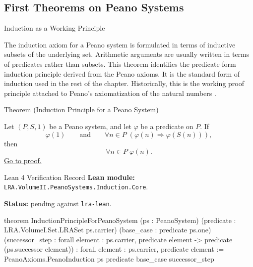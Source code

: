 \subsection*{First Theorems on Peano Systems}

\begin{topicbox}{Induction as a Working Principle}
\begin{exposition}
The induction axiom for a Peano system is formulated in terms of inductive
subsets of the underlying set. Arithmetic arguments are usually written in
terms of predicates rather than subsets. This theorem identifies the
predicate-form induction principle derived from the Peano axioms. It is the
standard form of induction used in the rest of the chapter. Historically,
this is the working proof principle attached to Peano's axiomatization of the
natural numbers \citep{PeanoArithmeticesPrincipia1889}.
\end{exposition}

\begin{theorembox}{Theorem (Induction Principle for a Peano System)}
\begin{theorem}
\label{thm:induction-principle-for-peano-system}
Let $(P,S,1)$ be a Peano system, and let $\varphi$ be a predicate on $P$.
If
\[
\varphi(1)
\qquad\text{and}\qquad
\forall n \in P\;(\varphi(n) \Longrightarrow \varphi(S(n))),
\]
then
\[
\forall n \in P\;\varphi(n).
\]
\hyperref[prf:induction-principle-for-peano-system]{Go to proof.}
\end{theorem}
\end{theorembox}

\begin{formalizationrecord}{Lean 4 Verification Record}
\textbf{Lean module:} \texttt{LRA.VolumeII.PeanoSystems.Induction.Core}.\par
{}
\textbf{Status:} pending against \texttt{lra-lean}.\par

\begin{leancode}
theorem InductionPrincipleForPeanoSystem
    (ps : PeanoSystem)
    (predicate : LRA.VolumeI.Set.LRASet ps.carrier)
    (base_case : predicate ps.one)
    (successor_step :
      forall element : ps.carrier,
        predicate element -> predicate (ps.successor element)) :
    forall element : ps.carrier, predicate element :=
  PeanoAxioms.PeanoInduction
    ps
    predicate
    base_case
    successor_step
\end{leancode}
\end{formalizationrecord}


\end{topicbox}
